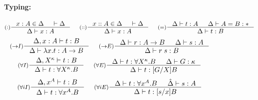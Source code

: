 \begin{figure}
\paragraph{Typing:}
\[ \inference[($:$)]{x:A \in \Delta & |- \Delta} 
                    {\Delta |- x:A}
 ~~~~
   \inference[($::$)]{x::A \in \Delta & |- \Delta} 
                     {\Delta |- x:A}
 ~~~~
   \inference[($=$)]{\Delta |- t :A & \Delta |- A = B : *}
                    {\Delta |- t : B}
\]
\[
   \inference[($->$$I$)]{\Delta, x:A |- t : B}
                        {\Delta |- \lambda x.t : A -> B}
 ~~~~
   \inference[($->$$E$)]{\Delta |- r : A -> B & \Delta |- s : A}
                        {\Delta |- r\;s : B}
\]
\[ \inference[($\forall I$)]{\Delta, X^\kappa |- t : B}
                            {\Delta |- t : \forall X^\kappa.B}
 ~~~~
   \inference[($\forall E$)]{ \Delta |- t : \forall X^\kappa.B
                            & \Delta |- G:\kappa }
                            {\Delta |- t : [G/X]B}
\]
\[ \inference[($\forall i I$)]{\Delta, x^A |- t : B}
                            {\Delta |- t : \forall x^A.B}
 ~~~~
   \inference[($\forall i E$)]{\Delta |- t : \forall x^A.B & \hat\Delta |- s:A}
                            {\Delta |- t : [s/x]B}
\]
\caption{\Fi}
\label{fig:Fi}
\end{figure}

